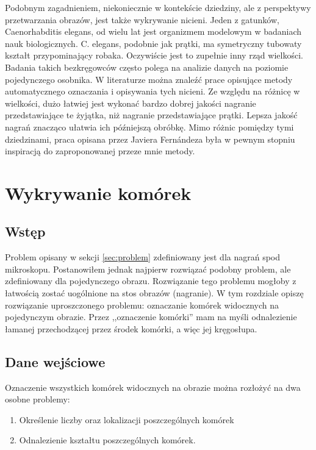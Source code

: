 \documentclass[declaration,shortabstract,mgr]{iithesis}
\begin{document}

Podobnym zagadnieniem, niekoniecznie w kontekście dziedziny, ale z perspektywy przetwarzania obrazów, jest także wykrywanie nicieni.
Jeden z gatunków, Caenorhabditis elegans, od wielu lat jest organizmem modelowym w badaniach nauk biologicznych\cite{wiki:c-elegans}.
C. elegans, podobnie jak prątki, ma symetryczny tubowaty kształt przypominający robaka.
Oczywiście jest to zupełnie inny rząd wielkości.
Badania takich bezkręgowców często polega na analizie danych na poziomie pojedynczego osobnika.
W literaturze można znaleźć prace opisujące metody automatycznego oznaczania i opisywania tych nicieni.
Ze względu na różnicę w wielkości, dużo łatwiej jest wykonać bardzo dobrej jakości nagranie przedstawiające te żyjątka, niż nagranie przedstawiające prątki.
Lepsza jakość nagrań znacząco ułatwia ich późniejszą obróbkę.
Mimo różnic pomiędzy tymi dziedzinami, praca opisana przez Javiera Fernándeza\cite{paper:worm-detection} była w pewnym stopniu inspiracją do zaproponowanej przeze mnie metody.


\section{Wykrywanie komórek}
\label{sec:cell-detection}

\subsection{Wstęp}

Problem opisany w sekcji \ref{sec:problem} zdefiniowany jest dla nagrań spod mikroskopu. Postanowiłem jednak najpierw rozwiązać podobny problem, ale zdefiniowany dla pojedynczego obrazu. Rozwiązanie tego problemu mogłoby z łatwością zostać uogólnione na stos obrazów (nagranie). W tym rozdziale opiszę rozwiązanie uproszczonego problemu: oznaczanie komórek widocznych na pojedynczym obrazie. Przez ,,oznaczenie komórki'' mam na myśli odnalezienie łamanej przechodzącej przez środek komórki, a więc jej kręgosłupa.

\subsection{Dane wejściowe}
\label{sec:detection-input}

Oznaczenie wszystkich komórek widocznych na obrazie można rozłożyć na dwa osobne problemy:
\begin{enumerate}
  \item Określenie liczby oraz lokalizacji poszczególnych komórek
  \item Odnalezienie kształtu poszczególnych komórek.
\end{enumerate}
\end{document}
